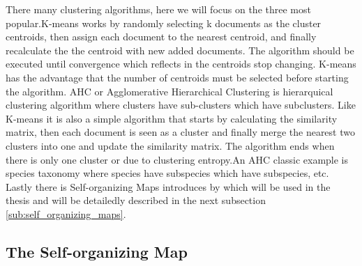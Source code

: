 There many clustering algorithms, here we will focus on the three most popular.K-means works by randomly selecting k documents as the cluster centroids, then assign each document to the nearest centroid, and finally recalculate the the centroid with new added documents. The algorithm should be executed until convergence which reflects in the centroids stop changing. K-means has the advantage that the number of centroids must be selected before starting the algorithm.
AHC or Agglomerative Hierarchical Clustering is hierarquical clustering algorithm where clusters have sub-clusters which have subclusters. Like K-means it is also a simple algorithm that starts by calculating the similarity matrix, then each document is seen as a cluster and finally merge the nearest two clusters into one and update the similarity matrix. The algorithm ends when there is only one cluster or due to clustering entropy.An AHC classic example is species taxonomy where species have subspecies which have subspecies, etc.
Lastly there is Self-organizing Maps introduces by \citep{Kohonen1990} which will be used in the thesis and will be detailedly described in the next subsection \ref{sub:self_organizing_maps}.

\subsection{The Self-organizing Map} %
\label{sub:the_self_organizing_map}


